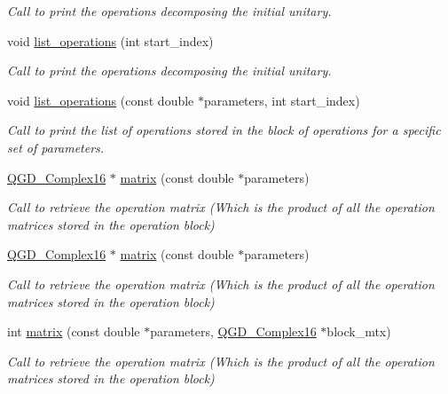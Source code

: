 \begin{DoxyCompactItemize}
\begin{DoxyCompactList}\small\item\em Call to print the operations decomposing the initial unitary. \end{DoxyCompactList}\item 
void \hyperlink{class_decomposition___base_a4c6c81d70f49ee249aa455a4f2718ee2}{list\+\_\+operations} (int start\+\_\+index)
\begin{DoxyCompactList}\small\item\em Call to print the operations decomposing the initial unitary. \end{DoxyCompactList}\item 
void \hyperlink{class_operation__block_a29e2c74d7fa7344193a17e39248eb803}{list\+\_\+operations} (const double $\ast$parameters, int start\+\_\+index)
\begin{DoxyCompactList}\small\item\em Call to print the list of operations stored in the block of operations for a specific set of parameters. \end{DoxyCompactList}\item 
\hyperlink{struct_q_g_d___complex16}{Q\+G\+D\+\_\+\+Complex16} $\ast$ \hyperlink{class_operation__block_a916db3ef5d6fcf25367843a1306cd4e0}{matrix} (const double $\ast$parameters)
\begin{DoxyCompactList}\small\item\em Call to retrieve the operation matrix (Which is the product of all the operation matrices stored in the operation block) \end{DoxyCompactList}\item 
\hyperlink{struct_q_g_d___complex16}{Q\+G\+D\+\_\+\+Complex16} $\ast$ \hyperlink{class_operation__block_a43cdb87a4ee2a339de30c94cc94fa40e}{matrix} (const double $\ast$parameters)
\begin{DoxyCompactList}\small\item\em Call to retrieve the operation matrix (Which is the product of all the operation matrices stored in the operation block) \end{DoxyCompactList}\item 
int \hyperlink{class_operation__block_abf4287a38eeca35a81163f86a361d95c}{matrix} (const double $\ast$parameters, \hyperlink{struct_q_g_d___complex16}{Q\+G\+D\+\_\+\+Complex16} $\ast$block\+\_\+mtx)
\begin{DoxyCompactList}\small\item\em Call to retrieve the operation matrix (Which is the product of all the operation matrices stored in the operation block) \end{DoxyCompactList}\item 

\end{DoxyCompactItemize}
